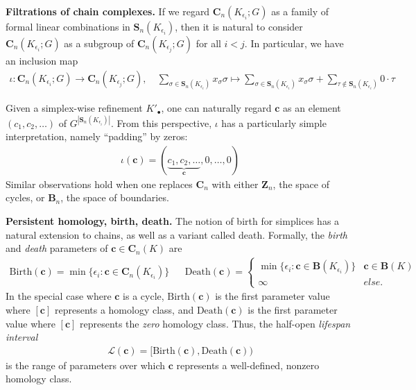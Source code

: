 \documentclass[utf8]{formatting_stuff/frontiersFPHY}
\newcommand{\Chains}{\mathbf{C}}
\newcommand{\Boundaries}[0]{\mathbf{B}}
\newcommand{\Simplices}[0]{\mathbf{S}}
\newcommand{\Cycles}[0]{\mathbf{Z}}
\newcommand{\chain}{\mathbf{c}}
\newcommand{\birth}{\mathrm{Birth}}
\newcommand{\death}{\mathrm{Death}}
\newcommand{\persinterval}{\mathcal{L}}
\theoremstyle{plain}
\theoremstyle{definition}
\begin{document}
 

\noindent \textbf{Filtrations of chain complexes.} If we regard $\Chains_n(K_{\epsilon_i}; G)$ as a family of formal linear combinations in $\Simplices_n(K_{\epsilon_i})$, then it is natural to consider $\Chains_n(K_{\epsilon_i}; G)$ as a subgroup of $\Chains_n(K_{\epsilon_{j}}; G)$ for all $i<j$.  In particular, we have an inclusion map     \begin{align*}
    \textstyle
    \iota: \Chains_n(K_{\epsilon_i}; G) \to \Chains_n(K_{\epsilon_j}; G),
    \quad
    \sum_{\sigma \in \Simplices_n(K_{\epsilon_i})} x_\sigma \sigma
    \mapsto
    \sum_{\sigma \in \Simplices_n(K_{\epsilon_i})} x_\sigma \sigma
    +
    \sum_{\tau \notin \Simplices_n(K_{\epsilon_i})} 
    0 \cdot \tau
    \end{align*}

Given a simplex-wise refinement $K'_\bullet$, one can naturally regard $\chain$ as an element  $(c_1, c_2,  \ldots)$ of $ G^{|\Simplices_n(K_{\epsilon_i})|}$.  From this perspective, $\iota$ has a particularly simple interpretation, namely  ``padding'' by zeros:
    \begin{align*}
        \iota(\chain) = ( \underbrace{c_1, c_2, \ldots}_{\chain}, 0, \ldots, 0)
    \end{align*}
Similar observations hold when one replaces $\Chains_n$ with either $\Cycles_n$, the space of cycles, or $\Boundaries_n$, the space of boundaries.



\noindent \textbf{Persistent homology, birth, death.} The notion of birth for simplices has a natural extension to chains, as well as a variant called death.  Formally,  the \emph{birth} and \emph{death} parameters of  $\chain \in \Chains_n(K)$ are 
    \begin{align*}
    \birth(\chain) = \min \{\epsilon_i : \chain \in \Chains_n(K_{\epsilon_i}) \}
    &&
    \death(\chain) 
    = 
    \begin{cases}
    \min \{\epsilon_i : \chain \in \Boundaries(K_{\epsilon_i}) \} & \chain \in \Boundaries(K)
    \\
    \infty & else.
    \end{cases}
    \end{align*}
In the special case where $\chain$ is a cycle,  $\birth(\chain)$ is the first parameter value where $[\chain]$ represents a homology class, and $\death(\chain)$ is the first parameter value where $[\chain]$ represents the \emph{zero} homology class.   Thus, the half-open
\emph{lifespan interval} 
    \begin{align*}
        \persinterval(\chain) = [\birth(\chain), \death(\chain))
    \end{align*}
is the range of parameters over which $\chain$ represents a well-defined, nonzero homology class.
\end{document}
